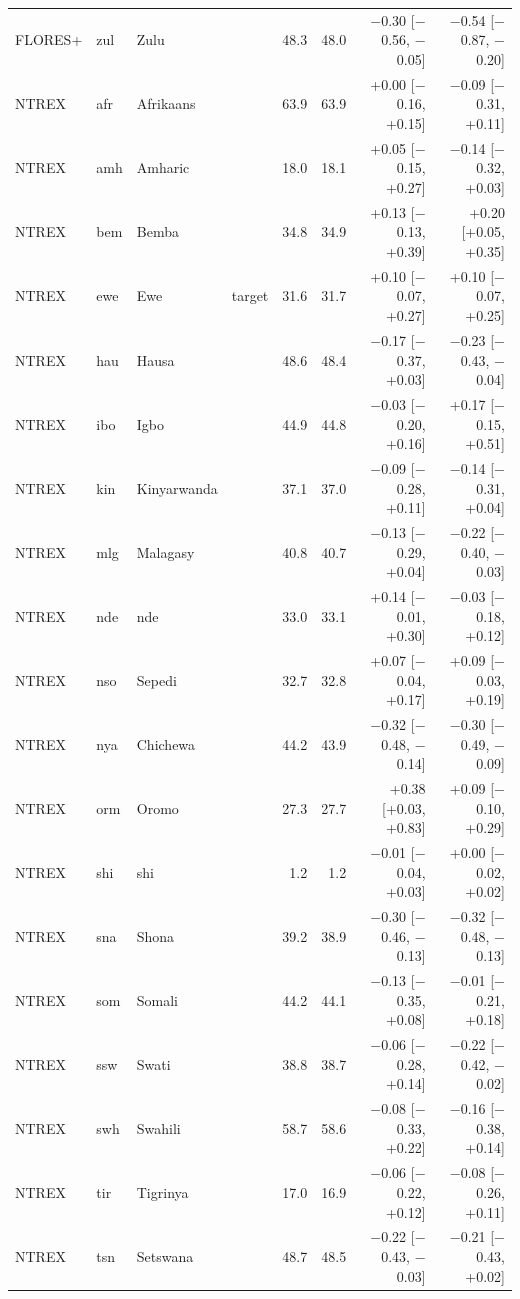 {\begin{longtable}{@{}lllcrrrr@{}}
FLORES+ & zul & Zulu &  & 48.3 & 48.0 & $-$0.30 [$-$0.56, $-$0.05] & $-$0.54 [$-$0.87, $-$0.20] \\
NTREX & afr & Afrikaans &  & 63.9 & 63.9 & +0.00 [$-$0.16, +0.15] & $-$0.09 [$-$0.31, +0.11] \\
NTREX & amh & Amharic &  & 18.0 & 18.1 & +0.05 [$-$0.15, +0.27] & $-$0.14 [$-$0.32, +0.03] \\
NTREX & bem & Bemba &  & 34.8 & 34.9 & +0.13 [$-$0.13, +0.39] & +0.20 [+0.05, +0.35] \\
NTREX & ewe & Ewe & target & 31.6 & 31.7 & +0.10 [$-$0.07, +0.27] & +0.10 [$-$0.07, +0.25] \\
NTREX & hau & Hausa &  & 48.6 & 48.4 & $-$0.17 [$-$0.37, +0.03] & $-$0.23 [$-$0.43, $-$0.04] \\
NTREX & ibo & Igbo &  & 44.9 & 44.8 & $-$0.03 [$-$0.20, +0.16] & +0.17 [$-$0.15, +0.51] \\
NTREX & kin & Kinyarwanda &  & 37.1 & 37.0 & $-$0.09 [$-$0.28, +0.11] & $-$0.14 [$-$0.31, +0.04] \\
NTREX & mlg & Malagasy &  & 40.8 & 40.7 & $-$0.13 [$-$0.29, +0.04] & $-$0.22 [$-$0.40, $-$0.03] \\
NTREX & nde & nde &  & 33.0 & 33.1 & +0.14 [$-$0.01, +0.30] & $-$0.03 [$-$0.18, +0.12] \\
NTREX & nso & Sepedi &  & 32.7 & 32.8 & +0.07 [$-$0.04, +0.17] & +0.09 [$-$0.03, +0.19] \\
NTREX & nya & Chichewa &  & 44.2 & 43.9 & $-$0.32 [$-$0.48, $-$0.14] & $-$0.30 [$-$0.49, $-$0.09] \\
NTREX & orm & Oromo &  & 27.3 & 27.7 & +0.38 [+0.03, +0.83] & +0.09 [$-$0.10, +0.29] \\
NTREX & shi & shi &  & 1.2 & 1.2 & $-$0.01 [$-$0.04, +0.03] & +0.00 [$-$0.02, +0.02] \\
NTREX & sna & Shona &  & 39.2 & 38.9 & $-$0.30 [$-$0.46, $-$0.13] & $-$0.32 [$-$0.48, $-$0.13] \\
NTREX & som & Somali &  & 44.2 & 44.1 & $-$0.13 [$-$0.35, +0.08] & $-$0.01 [$-$0.21, +0.18] \\
NTREX & ssw & Swati &  & 38.8 & 38.7 & $-$0.06 [$-$0.28, +0.14] & $-$0.22 [$-$0.42, $-$0.02] \\
NTREX & swh & Swahili &  & 58.7 & 58.6 & $-$0.08 [$-$0.33, +0.22] & $-$0.16 [$-$0.38, +0.14] \\
NTREX & tir & Tigrinya &  & 17.0 & 16.9 & $-$0.06 [$-$0.22, +0.12] & $-$0.08 [$-$0.26, +0.11] \\
NTREX & tsn & Setswana &  & 48.7 & 48.5 & $-$0.22 [$-$0.43, $-$0.03] & $-$0.21 [$-$0.43, +0.02] \\

\end{longtable}}
